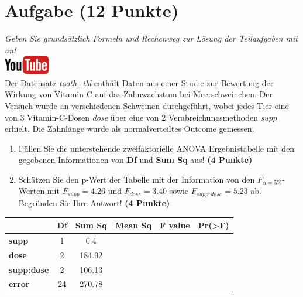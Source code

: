 \documentclass[a4paper, 9pt]{scrartcl}\usepackage[]{graphicx}\usepackage[]{xcolor}
\begin{document}
 
\clearpage

\section{Aufgabe \hfill (12 Punkte)}

\textit{Geben Sie grunds{\"a}tzlich Formeln und Rechenweg zur L{\"o}sung der
  Teilaufgaben mit an!} \\[1Ex]

\hfill\href{https://youtu.be/8Pb2sKUIMyk}{\includegraphics[width =
  2cm]{img/youtube}}\\[1Ex]



Der Datensatz \textit{tooth\_tbl} enth{\"a}lt Daten aus einer Studie zur
Bewertung der Wirkung von Vitamin C auf das Zahnwachstum bei
Meerschweinchen. Der Versuch wurde an verschiedenen Schweinen durchgef{\"u}hrt,
wobei jedes Tier eine von 3 Vitamin-C-Dosen \textit{dose}
{\"u}ber eine von 2 Verabreichungsmethoden \textit{supp}
erhielt. Die Zahnl{\"a}nge wurde als normalverteiltes Outcome gemessen.



\begin{enumerate}
\item F{\"u}llen Sie die unterstehende zweifaktorielle ANOVA Ergebnistabelle 
  mit den gegebenen Informationen von \textbf{Df} und \textbf{Sum Sq} aus!
  \textbf{(4 Punkte)}
\item Sch{\"a}tzen Sie den p-Wert der Tabelle mit der Information von den
  $F_{\alpha = 5\%}$-Werten mit
  $F_{supp} = 4.26$ und
  $F_{dose} = 3.40$ sowie
  $F_{supp:dose} = 5.23$ ab. Begr{\"u}nden Sie Ihre
  Antwort! \textbf{(4 Punkte)}
\end{enumerate}

\vspace{1Ex}

\begin{center}
  \Large
  \begin{tabular}{l|c|c|c|c|c}
     & \textbf{Df} & \textbf{Sum Sq} & \textbf{Mean Sq} & \textbf{F value} & \textbf{Pr(>F)} \strut\\
    \hline
   \textbf{supp}  & 1 & 0.4 &  &  &  \strut\\
    \hline
    \textbf{dose}  & 2 & 184.92 &  &  &  \strut\\
    \hline
    \textbf{supp:dose}  & 2 & 106.13 &  &  &  \strut\\
    \hline
   \textbf{error}  & 24 & 270.78 &  &  &  \strut\\
  \end{tabular}
\end{center}
\end{document}

